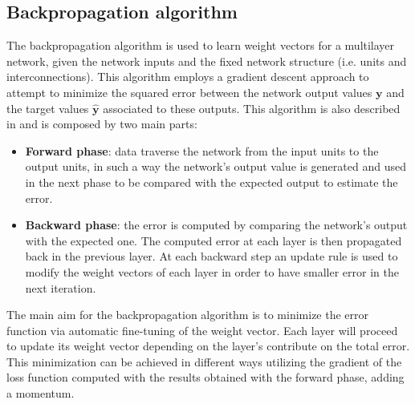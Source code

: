 \subsection{Backpropagation algorithm}
\label{backprop}
The backpropagation algorithm \parencite[see][chapter 4]{haykin_neural_2009} is used to learn weight vectors for a multilayer network, given the network inputs and the fixed network structure (i.e. units and interconnections). This algorithm employs a gradient descent approach to attempt to minimize the squared error between the network output values $\textbf{y}$ and the target values $\hat{\textbf{y}}$ associated to these outputs. This algorithm is also described in \cite{MLmitchell} and is composed by two main parts:
\begin{itemize}
    \item \textbf{Forward phase}: data traverse the network from the input units to the output units, in such a way the network's output value is generated and used in the next phase to be compared with the expected output to estimate the error.
    \item \textbf{Backward phase}: the error is computed by comparing the network's output with the expected one. The computed error at each layer is then propagated back in the previous layer. At each backward step an update rule is used to modify the weight vectors of each layer in order to have smaller error in the next iteration.
\end{itemize}
The main aim for the backpropagation algorithm is to minimize the error function via automatic fine-tuning of the weight vector. Each layer will proceed to update its weight vector depending on the layer's contribute on the total error. This minimization can be achieved in different ways utilizing the gradient of the loss function computed with the results obtained with the forward phase, adding a momentum.\newline
{}

